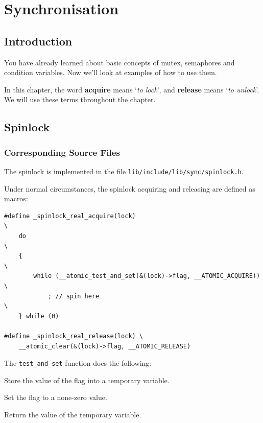\chapter{Synchronisation}

\section{Introduction}

You have already learned about basic concepts of mutex, semaphores and condition variables. Now we'll
look at examples of how to use them.

In this chapter, the word \textbf{acquire} means `\textit{to lock}', and \textbf{release} means
`\textit{to unlock}'. We will use these terms throughout the chapter.

\section{Spinlock}

\subsection{Corresponding Source Files}

The spinlock is implemented in the file \texttt{lib/include/lib/sync/spinlock.h}.

Under normal circumstances, the spinlock acquiring and releasing are defined as macros:

\begin{verbatim}
#define _spinlock_real_acquire(lock)                                    \
    do                                                                  \
    {                                                                   \
        while (__atomic_test_and_set(&(lock)->flag, __ATOMIC_ACQUIRE))  \
            ; // spin here                                              \
    } while (0)

#define _spinlock_real_release(lock) \
    __atomic_clear(&(lock)->flag, __ATOMIC_RELEASE)
\end{verbatim}

\begin{tip*}{The \texttt{test\_and\_set} function does the following:}
    \item Store the value of the flag into a temporary variable.
    \item Set the flag to a none-zero value.
    \item Return the value of the temporary variable.
\end{tip*}

